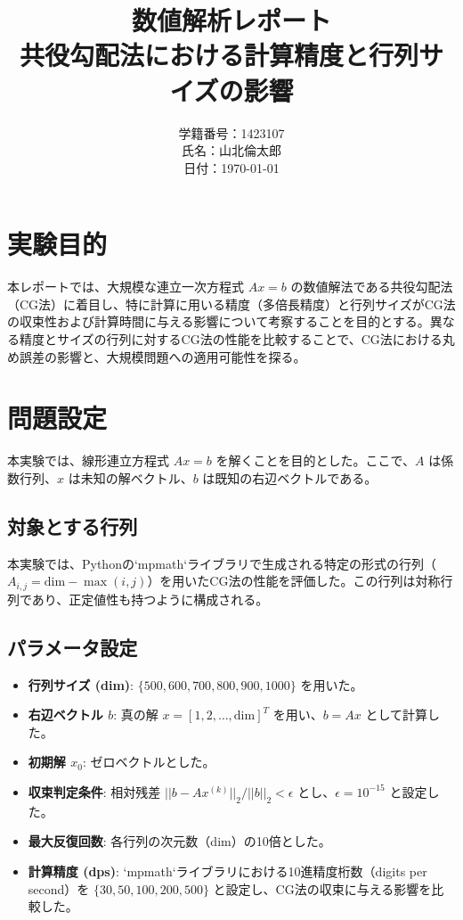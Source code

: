 \documentclass{article}
\begin{document}
\title{数値解析レポート\\共役勾配法における計算精度と行列サイズの影響}
\author{学籍番号：1423107 \\ 氏名：山北倫太郎 \\ 日付：\today}
\date{}

\maketitle

\section{実験目的}
本レポートでは、大規模な連立一次方程式 $Ax=b$ の数値解法である共役勾配法（CG法）に着目し、特に計算に用いる精度（多倍長精度）と行列サイズがCG法の収束性および計算時間に与える影響について考察することを目的とする。異なる精度とサイズの行列に対するCG法の性能を比較することで、CG法における丸め誤差の影響と、大規模問題への適用可能性を探る。

\section{問題設定}
本実験では、線形連立方程式 $Ax=b$ を解くことを目的とした。ここで、$A$ は係数行列、$x$ は未知の解ベクトル、$b$ は既知の右辺ベクトルである。

\subsection{対象とする行列}
本実験では、Pythonの`mpmath`ライブラリで生成される特定の形式の行列（$A_{i,j} = \text{dim} - \max(i, j)$）を用いたCG法の性能を評価した。この行列は対称行列であり、正定値性も持つように構成される。

\subsection{パラメータ設定}
\begin{itemize}
    \item \textbf{行列サイズ (dim)}: $\{500, 600, 700, 800, 900, 1000\}$ を用いた。
    \item \textbf{右辺ベクトル $b$}: 真の解 $x = [1, 2, \dots, \text{dim}]^T$ を用い、$b = Ax$ として計算した。
    \item \textbf{初期解 $x_0$}: ゼロベクトルとした。
    \item \textbf{収束判定条件}: 相対残差 $||b-Ax^{(k)}||_2 / ||b||_2 < \epsilon$ とし、$\epsilon = 10^{-15}$ と設定した。
    \item \textbf{最大反復回数}: 各行列の次元数（dim）の10倍とした。
    \item \textbf{計算精度 (dps)}: `mpmath`ライブラリにおける10進精度桁数（digits per second）を $\{30, 50, 100, 200, 500\}$ と設定し、CG法の収束に与える影響を比較した。
\end{itemize}
\end{document}
